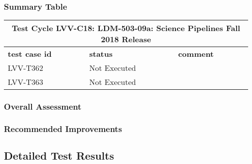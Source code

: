 \documentclass[DM,lsstdraft,STR,toc]{lsstdoc}
\begin{document}
\subsubsection{Summary Table}
\label{sect:summarytable}


\begin{longtable} {p{}p{}p{}}
\toprule
\multicolumn{3}{c}{ Test Cycle {\bf LVV-C18: LDM-503-09a: Science Pipelines Fall 2018 Release }} \\\hline
{\bf \footnotesize test case id} & {\bf \footnotesize status} & {\bf \footnotesize comment} \\\toprule
LVV-T362 & Not Executed &  \\\hline
LVV-T363 & Not Executed &  \\\hline
\end{longtable}

\subsubsection{Overall Assessment}
\label{sect:overallassessment}


\subsubsection{Recommended Improvements}
\label{sect:recommendations}

\subsection{Detailed Test Results}
\label{sect:detailedtestresults}
\end{document}
